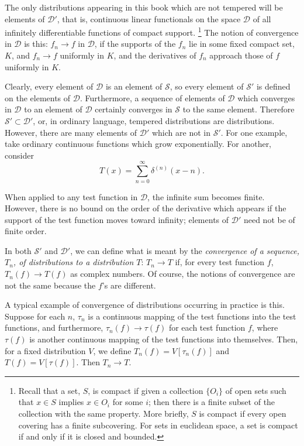 The only distributions appearing in this book which are not tempered will be
elements of $\mathcal{D}'$, that is, continuous linear functionals on the
space $\mathcal{D}$ of all infinitely differentiable functions of compact
support.%
\footnote{
Recall that a set, $S$, is compact if given a collection $\{O_i\}$ of open
sets such that $x\in S$ implies $x\in O_i$ for some $i$; then there is a finite
subset of the collection with the same property. More briefly, $S$ is compact
if every open covering has a finite subcovering. For sets in euclidean space,
a set is compact if and only if it is closed and bounded.} The notion of
convergence in $\mathcal{D}$ is this: $f_n\to f$ in $\mathcal{D}$, if the
supports of the $f_n$ lie in some fixed compact set, $K$, and $f_n\to f$
uniformly in $K$, and the derivatives of $f_n$ approach those of $f$ uniformly
in $K$.

Clearly, every element of $\mathcal{D}$ is an element of $\mathcal{S}$, so
every element of $\mathcal{S}'$ is defined on the elements of $\mathcal{D}$.
Furthermore, a sequence of elements of $\mathcal{D}$ which converges in
$\mathcal{D}$ to an element of $\mathcal{D}$ certainly converges in $\mathcal{S}$
to the same element. Therefore $\mathcal{S}'\subset\mathcal{D}'$, or, in
ordinary language, tempered distributions are distributions. However, there
are many elements of $\mathcal{D}'$ which are not in $\mathcal{S}'$. For one
example, take ordinary continuous functions which grow exponentially. For
another, consider
\begin{equation*}
  T(x)=\sum_{n=0}^{\infty}\delta^{(n)}(x-n).
\end{equation*}

When applied to any test function in $\mathcal{D}$, the infinite sum becomes
finite. However, there is no bound on the order of the derivative which
appears if the support of the test function moves toward infinity; elements of
$\mathcal{D}'$ need not be of finite order.

In both $\mathcal{S}'$ and $\mathcal{D}'$, we can define what is meant by the
\emph{convergence of a sequence, $T_n$, of distributions to a distribution
$T$}: $T_n\to T$ if, for every test function $f$, $T_n(f)\to T(f)$ as complex
numbers. Of course, the notions of convergence are not the same because the
$f$'s are different.

A typical example of convergence of distributions occurring in practice is
this. Suppose for each $n$, $\tau_n$ is a continuous mapping of the test
functions into the test functions, and furthermore, $\tau_n(f)\to\tau(f)$ for
each test function $f$, where $\tau(f)$ is another continuous mapping of the
test functions into themselves. Then, for a fixed distribution $V$, we define
$T_n(f)=V[\tau_n(f)]$ and $T(f)=V[\tau(f)]$. Then $T_n\to T$.

